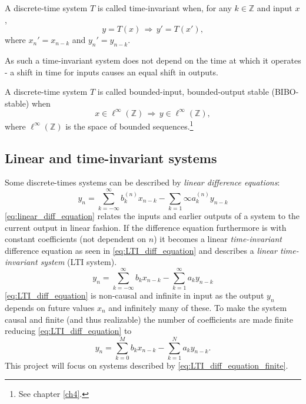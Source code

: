 \begin{definition}\label{def:time_invariant_system}
A discrete-time system $T$ is called time-invariant when, for any $k\in\mathbb{Z}$ and input $x$,
\begin{equation}
y=T(x)\,\Rightarrow\,y'=T(x'),
\end{equation}
where $x_n'=x_{n-k}$ and $y_n'=y_{n-k}$.
\end{definition}
As such a time-invariant system does not depend on the time at which it operates - a shift in time for inputs causes an equal shift in outputs.
\begin{definition}\label{def:BIBO_stable_system}
A discrete-time system $T$ is called bounded-input, bounded-output stable (BIBO-stable) when
\begin{equation}
x\in\ell^{\infty}(\mathbb{Z})\,\Rightarrow\,y\in\ell^{\infty}(\mathbb{Z}),
\end{equation}
where $\ell^{\infty}(\mathbb{Z})$ is the space of bounded sequences.\footnote{See chapter \ref{ch4}.}
\end{definition}
\subsection{Linear and time-invariant systems}
Some discrete-times systems can be described by \textit{linear difference equations}:
\begin{equation}\label{eq:linear_diff_equation}
y_n=\sum_{k=-\infty}^{\infty}b_k^{(n)}x_{n-k}-\sum_{k=1}{\infty}a_k^{(n)}y_{n-k}
\end{equation}
\eqref{eq:linear_diff_equation} relates the inputs and earlier outputs of a system to the current output in linear fashion. If the difference equation furthermore is with constant coefficients (not dependent on $n$) it becomes a linear \textit{time-invariant} difference equation as seen in \eqref{eq:LTI_diff_equation} and describes a \textit{linear time-invariant system} (LTI system).
\begin{equation}\label{eq:LTI_diff_equation}
y_n=\sum_{k=-\infty}^{\infty}b_kx_{n-k}-\sum_{k=1}^{\infty}a_ky_{n-k}
\end{equation}
\eqref{eq:LTI_diff_equation} is non-causal and infinite in input as the output $y_n$ depends on future values $x_n$ and infinitely many of these. To make the system causal and finite (and thus realizable) the number of coefficients are made finite reducing \eqref{eq:LTI_diff_equation} to
\begin{equation}\label{eq:LTI_diff_equation_finite}
y_n=\sum_{k=0}^Mb_kx_{n-k}-\sum_{k=1}^Na_ky_{n-k}.
\end{equation}
This project will focus on systems described by \eqref{eq:LTI_diff_equation_finite}.
